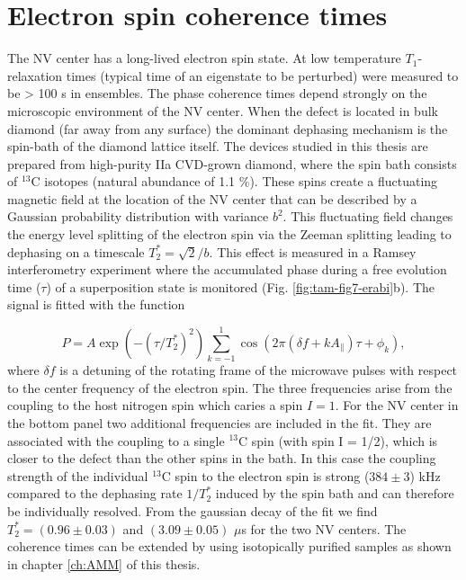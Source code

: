 \section{Electron spin coherence times}
\label{sec:elcohtimes}
The NV center has a long-lived electron spin state. At low temperature $T_1$-relaxation times (typical time of an eigenstate to be perturbed) were measured to be > 100 s in ensembles\cite{Jarmola_Phys.Rev.Lett._2012}. The phase coherence times depend strongly on the microscopic environment of the NV center. When the defect is located in bulk diamond (far away from any surface) the dominant dephasing mechanism is the spin-bath of the diamond lattice itself. The devices studied in this thesis are prepared from high-purity IIa CVD-grown diamond, where the spin bath consists of $^{13}$C isotopes (natural abundance of 1.1 $\%$). These spins create a fluctuating magnetic field at the location of the NV center that can be described by a Gaussian probability distribution with variance $b^2$. This fluctuating field changes the energy level splitting of the electron spin via the Zeeman splitting leading to dephasing on a timescale $T_2^{*} = \sqrt{2}/b$. This effect is measured in a Ramsey interferometry experiment where the accumulated phase during a free evolution time ($\tau$) of a superposition state is monitored (Fig. \ref{fig:tam-fig7-erabi}b). The signal is fitted with the function

\begin{equation}\label{eq:tam-ramsey}
P = A \exp(-(\tau/T_2^*)^2)\sum\limits_{k=-1}^1 \cos(2 \pi(\delta f +k A_{\parallel})\tau +\phi_k),
\end{equation}
where $\delta f$ is a detuning of the rotating frame of the microwave pulses with respect to the center frequency of the electron spin. The three frequencies arise from the coupling to the host nitrogen spin which caries a spin $I = 1$. For the NV center in the bottom panel two additional frequencies are included in the fit. They are associated with the coupling to a single $^{13}$C spin (with spin I = 1/2), which is closer to the defect than the other spins in the bath. In this case the coupling strength of the individual $^{13}$C spin to the electron spin is strong ($384 \pm 3$) kHz compared to the dephasing rate $1/T_2^*$ induced by the spin bath and can therefore be individually resolved. From the gaussian decay of the fit we find $T_2^{*} = (0.96 \pm 0.03)$ and $(3.09 \pm 0.05)$ $\mu$s for the two NV centers. The coherence times can be extended by using isotopically purified samples as shown in chapter \ref{ch:AMM} of this thesis. 

